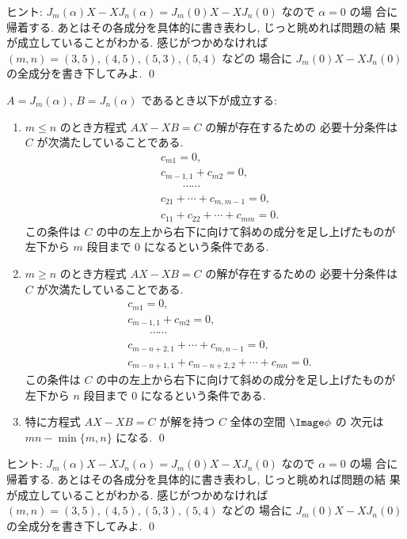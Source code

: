 \documentclass[12pt,twoside]{jarticle}
\begin{document}
\noindent
ヒント: $J_m(\alpha)X-XJ_n(\alpha)=J_m(0)X-XJ_n(0)$ なので $\alpha=0$ の場
合に帰着する.  あとはその各成分を具体的に書き表わし, じっと眺めれば問題の結
果が成立していることがわかる.
感じがつかめなければ $(m,n)=(3,5),(4,5),(5,3),(5,4)$ などの
場合に $J_m(0)X-XJ_n(0)$ の全成分を書き下してみよ.
\qed


\begin{question}
\label{q:alpha=beta:AX-XB=C}
  $A=J_m(\alpha)$, $B=J_n(\alpha)$ であるとき以下が成立する:
  \begin{enumerate}
  \item $m\le n$ のとき方程式 $AX-XB=C$ の解が存在するための
    必要十分条件は $C$ が次満たしていることである.
    \begin{align*}
      &
      c_{m1} = 0,
      \\ &
      c_{m-1,1} + c_{m2} = 0,
      \\ &
      \qquad\cdots\cdots
      \\ &
      c_{21} + \cdots + c_{m,m-1} = 0,
      \\ &
      c_{11} + c_{22} + \cdots + c_{mm} = 0.
    \end{align*}
    この条件は $C$ の中の左上から右下に向けて斜めの成分を足し上げたものが
    左下から $m$ 段目まで $0$ になるという条件である.
  \item $m\ge n$ のとき方程式 $AX-XB=C$ の解が存在するための
    必要十分条件は $C$ が次満たしていることである.
    \begin{align*}
      &
      c_{m1} = 0,
      \\ &
      c_{m-1,1} + c_{m2} = 0,
      \\ &
      \qquad\cdots\cdots
      \\ &
      c_{m-n+2,1} + \cdots + c_{m,n-1} = 0,
      \\ &
      c_{m-n+1,1} + c_{m-n+2,2} + \cdots + c_{mn} = 0.
    \end{align*}
    この条件は $C$ の中の左上から右下に向けて斜めの成分を足し上げたものが
    左下から $n$ 段目まで $0$ になるという条件である.
  \item 特に方程式 $AX-XB=C$ が解を持つ $C$ 全体の空間 $\Image\phi$ の
    次元は $mn-\min\{m,n\}$ になる.
    \qed
  \end{enumerate}
\end{question}

\noindent
ヒント: $J_m(\alpha)X-XJ_n(\alpha)=J_m(0)X-XJ_n(0)$ なので $\alpha=0$ の場
合に帰着する.  あとはその各成分を具体的に書き表わし, じっと眺めれば問題の結
果が成立していることがわかる.
感じがつかめなければ $(m,n)=(3,5),(4,5),(5,3),(5,4)$ などの
場合に $J_m(0)X-XJ_n(0)$ の全成分を書き下してみよ.
\qed
\end{document}
